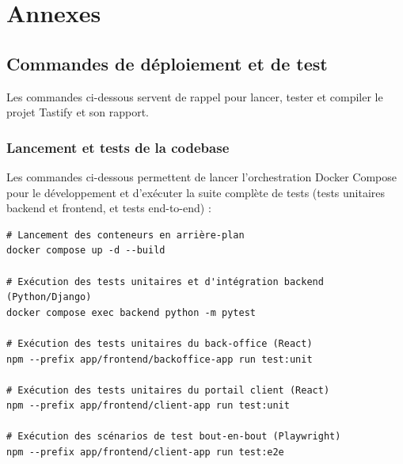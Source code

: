 \chapter{Annexes}
\label{chap:annexes}

\section{Commandes de déploiement et de test}
Les commandes ci-dessous servent de rappel pour lancer, tester et compiler le projet Tastify et son rapport.

\subsection{Lancement et tests de la codebase}
Les commandes ci-dessous permettent de lancer l'orchestration Docker Compose pour le développement et d'exécuter la suite complète de tests (tests unitaires backend et frontend, et tests end-to-end) :
\begin{verbatim}
# Lancement des conteneurs en arrière-plan
docker compose up -d --build

# Exécution des tests unitaires et d'intégration backend (Python/Django)
docker compose exec backend python -m pytest

# Exécution des tests unitaires du back-office (React)
npm --prefix app/frontend/backoffice-app run test:unit

# Exécution des tests unitaires du portail client (React)
npm --prefix app/frontend/client-app run test:unit

# Exécution des scénarios de test bout-en-bout (Playwright)
npm --prefix app/frontend/client-app run test:e2e
\end{verbatim}
